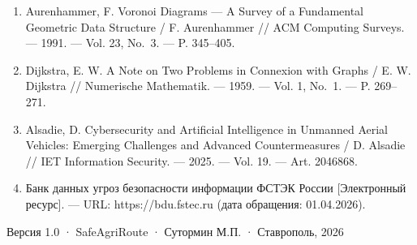 \documentclass[14pt,a4paper]{extarticle}
\begin{document}
\begin{enumerate}
\item
  Aurenhammer, F. Voronoi Diagrams --- A Survey of a Fundamental Geometric Data Structure / F. Aurenhammer // ACM Computing Surveys. --- 1991. --- Vol. 23, No.~3. --- P. 345--405.
\item
  Dijkstra, E. W. A Note on Two Problems in Connexion with Graphs / E. W. Dijkstra // Numerische Mathematik. --- 1959. --- Vol. 1, No.~1. --- P. 269--271.
\item
  Alsadie, D. Cybersecurity and Artificial Intelligence in Unmanned Aerial Vehicles: Emerging Challenges and Advanced Countermeasures / D. Alsadie // IET Information Security. --- 2025. --- Vol. 19. --- Art. 2046868.
\item
  Банк данных угроз безопасности информации ФСТЭК России {[}Электронный ресурс{]}. --- URL: https://bdu.fstec.ru (дата обращения: 01.04.2026).
\end{enumerate}


Версия 1.0 · SafeAgriRoute · Сутормин М.П. · Ставрополь, 2026
\end{document}

